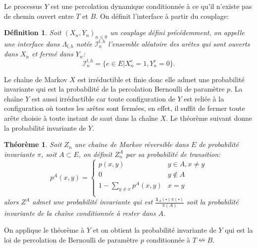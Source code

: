 \documentclass[titlepage,a4paper,11pt]{article}
\newcounter{def}
\newcounter{thm}
\newtheorem{interface}[def]{Définition}
\newtheorem{probainv}[thm]{Théorème}
\newcommand{\nconnect}{\nleftrightarrow}
\begin{document}
Le processus $Y$ est une percolation dynamique conditionnée à ce qu'il n'existe pas de chemin ouvert entre $T$ et $B$. On définit l'interface à partir du couplage:
\begin{interface}
Soit $(X_n,Y_n)_{n\leqslant 0}$ un couplage défini précédemment, on appelle une interface dans $\Lambda_{l,h}$ notée $\mathcal{I}^{l,h}_n$ l'ensemble aléatoire des arêtes qui sont ouverts dans $X_n$ et fermé dans $Y_n$: $$ \mathcal{I}^{l,h}_n = \big\{ e\in E| X_n^e = 1, Y_n^e = 0 \big\}.
$$
\end{interface}
Le chaîne de Markov $X$ est irréductible et finie donc elle admet une probabilité invariante qui est la probabilité de la percolation Bernoulli de paramètre $p$. La chaîne $Y$ est aussi irréductible car toute configuration de $Y$ est reliée à la configuration où toutes les arêtes sont fermées, en effet, il suffit de fermer toute arête choisie à toute instant de saut dans la chaîne $X$. Le théorème suivant donne la probabilité invariante de $Y$.
\begin{probainv}
Soit $Z_n$ une chaîne de Markov réversible dans $E$ de probabilité invariante $\pi$, soit $A\subset E$, on définit $Z_n^A$ par sa probabilité de transition:
$$p^A(x,y)=\left\lbrace \begin{array}{cc}
p(x,y) & y\in A, x\neq y \\
0 & y\notin A \\
1-\sum_{y\neq x}p^A(x,y) & x = y\\
\end{array}
\right.
$$
alors $Z^A$ admet une probabilité invariante qui est $\frac{\mathbf{1}_A(\centerdot)\pi(\centerdot)}{\pi(A)}$ soit la probabilité invariante de la chaîne conditionnée à rester dans $A$.
\end{probainv}

On applique le théorème à $Y$ et on obtient la probabilité invariante de $Y$ qui est la loi de percolation de Bernoulli de paramètre $p$ conditionnée à $T\nconnect B$.
\end{document}
